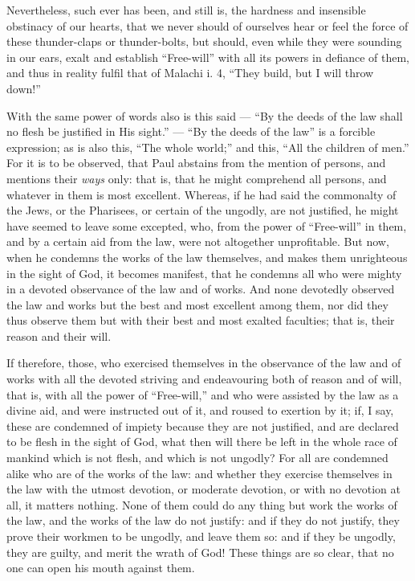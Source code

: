Nevertheless, such ever has been, and still is, the hardness and insensible obstinacy of our hearts, that we never should of ourselves hear or feel the force of these thunder-claps or thunder-bolts, but should, even while they were sounding in our ears, exalt and establish “Free-will” with all its powers in defiance of them, and thus in reality fulfil that of Malachi i. 4, “They build, but I will throw down!”

With the same power of words also is this said — “By the deeds of the law shall no flesh be justified in His sight.” — “By the deeds of the law” is a forcible expression; as is also this, “The whole world;” and this, “All the children of men.” For it is to be observed, that Paul abstains from the mention of persons, and mentions their \emph{ways }only: that is, that he might comprehend all persons, and whatever in them is most excellent. Whereas, if he had said the commonalty of the Jews, or the Pharisees, or certain of the ungodly, are not justified, he might have seemed to leave some excepted, who, from the power of “Free-will” in them, and by a certain aid from the law, were not altogether unprofitable. But now, when he condemns the works of the law themselves, and makes them unrighteous in the sight of God, it becomes manifest, that he condemns all who were mighty in a devoted observance of the law and of works. And none devotedly observed the law and works but the best and most excellent among them, nor did they thus observe them but with their best and most exalted faculties; that is, their reason and their will.

If therefore, those, who exercised themselves in the observance of the law and of works with all the devoted striving and endeavouring both of reason and of will, that is, with all the power of “Free-will,” and who were assisted by the law as a divine aid, and were instructed out of it, and roused to exertion by it; if, I say, these are condemned of impiety because they are not justified, and are declared to be flesh in the sight of God, what then will there be left in the whole race of mankind which is not flesh, and which is not ungodly? For all are condemned alike who are of the works of the law: and whether they exercise themselves in the law with the utmost devotion, or moderate devotion, or with no devotion at all, it matters nothing. None of them could do any thing but work the works of the law, and the works of the law do not justify: and if they do not justify, they prove their workmen to be ungodly, and leave them so: and if they be ungodly, they are guilty, and merit the wrath of God! These things are so clear, that no one can open his mouth against them.

